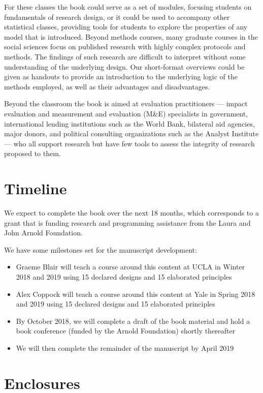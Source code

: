 \documentclass[11pt]{article}
\begin{document}
For these classes the book could serve as a set of modules, focusing students on fundamentals of research design, or it could be used to accompany other statistical classes, providing tools for students to explore the properties of any model that is introduced. Beyond methods courses, many graduate courses in the social sciences focus on published research with highly complex protocols and methods. The findings of such research are difficult to interpret without some understanding of the underlying design. Our short-format overviews could be given as handouts to provide an introduction to the underlying logic of the methods employed, as well as their advantages and disadvantages. 

Beyond the classroom the book is aimed at evaluation practitioners --- impact evaluation and measurement and evaluation (M\&E) specialists in government, international lending institutions such as the World Bank, bilateral aid agencies, major donors, and political consulting organizations such as the Analyst Institute ---  who all support research but have few tools to assess the integrity of research proposed to them.


\section{Timeline}

We expect to complete the book over the next 18 months, which corresponds to a grant that is funding research and programming assistance from the Laura and John Arnold Foundation.

We have some milestones set for the manuscript development:

\begin{itemize}
\item 	Graeme Blair will teach a course around this content at UCLA in Winter 2018 and 2019 using 15 declared designs and 15 elaborated principles
\item 	Alex Coppock will teach a course around this content at Yale in Spring 2018 and 2019 using 15 declared designs and 15 elaborated principles
\item  By October 2018, we will complete a draft of the book material and hold a book conference (funded by the Arnold Foundation) shortly thereafter
\item We will then complete the remainder of the manuscript by April 2019
\end{itemize}

\section{Enclosures}
\end{document}
